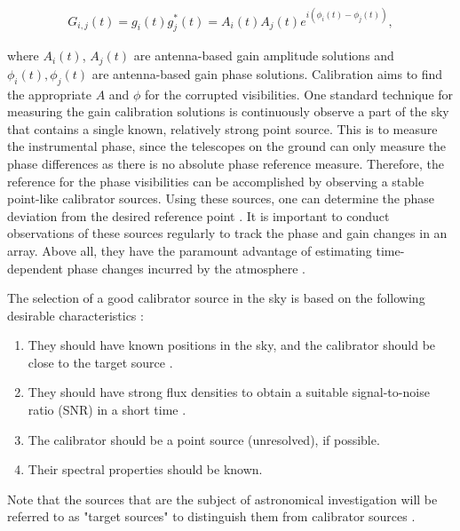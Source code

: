 \begin{align}
G_{i,j}(t)= g_i(t)g^*_j(t) = A_{i}(t)A_{j}(t) e ^{i\left(\phi_i(t)-\phi_j(t)\right)},
\label{Sols}
\end{align}

where  $A_{i}(t)$, $A_{j}(t)$ are antenna-based gain amplitude solutions and $\phi_i(t),\phi_j(t)$ are antenna-based gain phase solutions. Calibration aims to find the appropriate $A$ and $\phi$ for the corrupted visibilities. One standard technique for measuring the gain calibration solutions is continuously observe a part of the sky that contains a single known, relatively strong point source. This is to measure the instrumental phase, since the telescopes on the ground can only measure the phase differences as there is no absolute phase reference measure. Therefore, the reference for the phase visibilities can be accomplished by observing a stable point-like calibrator sources. Using these sources, one can determine the phase deviation from the desired reference point \citep{taylor1999synthesis}. It is important to conduct observations of these sources regularly to track the phase and gain changes in an array. Above all, they have the paramount advantage of estimating time-dependent phase changes incurred by the atmosphere \citep{taylor1999synthesis}.

The selection of a good calibrator source in the sky is based on the following desirable characteristics \citep{thompson2001interferometry}: 

\begin{enumerate}
\item They should have known positions in the sky, and the calibrator should be close to the target source \citep{taylor1999synthesis}. 
\item  They should have strong flux densities to obtain a suitable signal-to-noise ratio (SNR) in a short time \citep{taylor1999synthesis}.
 \item The calibrator should be a point source (unresolved), if possible. 
 \item Their spectral properties should be known.
 \end{enumerate}
 
 Note that the sources that are the subject of astronomical investigation will be referred to as "target sources" to distinguish them from calibrator sources \citep{thompson2001interferometry}.
 
